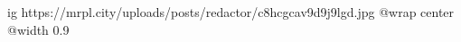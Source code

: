  
 
 
 
 

\ifcmt
  ig https://mrpl.city/uploads/posts/redactor/c8hcgcav9d9j9lgd.jpg
  @wrap center
  @width 0.9
\fi
